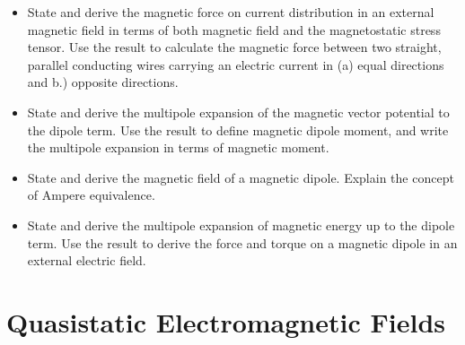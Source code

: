 \begin{itemize}
    \item State and derive the magnetic force on current distribution in an external magnetic field in terms of both magnetic field and the magnetostatic stress tensor. Use the result to calculate the magnetic force between two straight, parallel conducting wires carrying an electric current in (a) equal directions and b.) opposite directions.

    \item State and derive the multipole expansion of the magnetic vector potential to the dipole term. Use the result to define magnetic dipole moment, and write the multipole expansion in terms of magnetic moment.

    \item State and derive the magnetic field of a magnetic dipole. Explain the concept of Ampere equivalence.

    \item State and derive the multipole expansion of magnetic energy up to the dipole term. Use the result to derive the force and torque on a magnetic dipole in an external electric field.

\end{itemize}

\section{Quasistatic Electromagnetic Fields}

